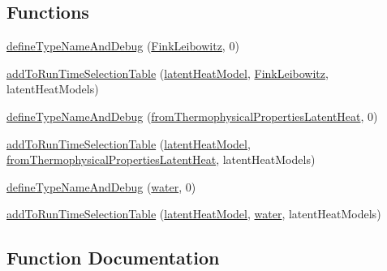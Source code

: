\subsection*{Functions}
\begin{DoxyCompactItemize}
\item 
\hyperlink{namespaceFoam_1_1latentHeatModels_a6587082eb2c87a2f463a5471becc8f80}{define\+Type\+Name\+And\+Debug} (\hyperlink{classFoam_1_1latentHeatModels_1_1FinkLeibowitz}{Fink\+Leibowitz}, 0)
\item 
\hyperlink{namespaceFoam_1_1latentHeatModels_a71a7c2465d9bd19ff3e5e83888e4687d}{add\+To\+Run\+Time\+Selection\+Table} (\hyperlink{classFoam_1_1latentHeatModel}{latent\+Heat\+Model}, \hyperlink{classFoam_1_1latentHeatModels_1_1FinkLeibowitz}{Fink\+Leibowitz}, latent\+Heat\+Models)
\item 
\hyperlink{namespaceFoam_1_1latentHeatModels_a0a9f11acdbbfc539e16f6d9faa16f5a9}{define\+Type\+Name\+And\+Debug} (\hyperlink{classFoam_1_1latentHeatModels_1_1fromThermophysicalPropertiesLatentHeat}{from\+Thermophysical\+Properties\+Latent\+Heat}, 0)
\item 
\hyperlink{namespaceFoam_1_1latentHeatModels_a65d0300798ac32623fcc1ad44f46eb08}{add\+To\+Run\+Time\+Selection\+Table} (\hyperlink{classFoam_1_1latentHeatModel}{latent\+Heat\+Model}, \hyperlink{classFoam_1_1latentHeatModels_1_1fromThermophysicalPropertiesLatentHeat}{from\+Thermophysical\+Properties\+Latent\+Heat}, latent\+Heat\+Models)
\item 
\hyperlink{namespaceFoam_1_1latentHeatModels_af72dbd61a38fe62a8dfc1baca12fa596}{define\+Type\+Name\+And\+Debug} (\hyperlink{classFoam_1_1latentHeatModels_1_1water}{water}, 0)
\item 
\hyperlink{namespaceFoam_1_1latentHeatModels_a541220b30957205cae1c7d90d5996619}{add\+To\+Run\+Time\+Selection\+Table} (\hyperlink{classFoam_1_1latentHeatModel}{latent\+Heat\+Model}, \hyperlink{classFoam_1_1latentHeatModels_1_1water}{water}, latent\+Heat\+Models)
\end{DoxyCompactItemize}


\subsection{Function Documentation}
\mbox{\label{namespaceFoam_1_1latentHeatModels_a6587082eb2c87a2f463a5471becc8f80}} 
